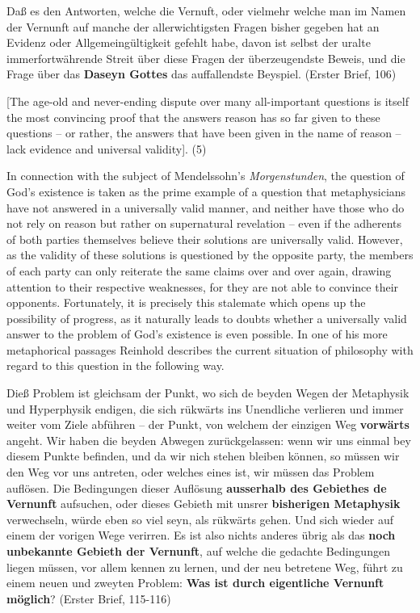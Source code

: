 Da\ss{} es den Antworten, welche die Vernuft, oder vielmehr welche man im Namen der Vernunft auf manche der allerwichtigsten Fragen bisher gegeben hat an Evidenz oder Allgemeing\"{u}ltigkeit gefehlt habe, davon ist selbst der uralte immerfortw\"{a}hrende Streit \"{u}ber diese Fragen der \"{u}berzeugendste Beweis, und die Frage \"{u}ber das \textbf{Daseyn Gottes} das auffallendste Beyspiel. (Erster Brief, 106)

[The age{-}old and never{-}ending dispute over many all{-}important questions is itself the most convincing proof that the answers reason has so far given to these questions {--} or rather, the answers that have been given in the name of reason {--} lack evidence and universal validity]. (5)

In connection with the subject of Mendelssohn's \textit{Morgenstunden}, the question of God's existence is taken as the prime example of a question that metaphysicians have not answered in a universally valid manner, and neither have those who do not rely on reason but rather on supernatural revelation {--} even if the adherents of both parties themselves believe their solutions are universally valid. However, as the validity of these solutions is questioned by the opposite party, the members of each party can only reiterate the same claims over and over again, drawing attention to their respective weaknesses, for they are not able to convince their opponents. Fortunately, it is precisely this stalemate which opens up the possibility of progress, as it naturally leads to doubts whether a universally valid answer to the problem of God's existence is even possible. In one of his more metaphorical passages Reinhold describes the current situation of philosophy with regard to this question in the following way. 

Die\ss{} Problem ist gleichsam der Punkt, wo sich de beyden Wegen der Metaphysik und Hyperphysik endigen, die sich r\"{u}kw\"{a}rts ins Unendliche verlieren und immer weiter vom Ziele abf\"{u}hren {--} der Punkt, von welchem der einzigen Weg \textbf{vorw\"{a}rts} angeht. Wir haben die beyden Abwegen zur\"{u}ckgelassen: wenn wir uns einmal bey diesem Punkte befinden, und da wir nich stehen bleiben k\"{o}nnen, so m\"{u}ssen wir den Weg vor uns antreten, oder welches eines ist, wir m\"{u}ssen das Problem aufl\"{o}sen. Die Bedingungen dieser Aufl\"{o}sung \textbf{ausserhalb des Gebiethes de Vernunft} aufsuchen, oder dieses Gebieth mit unsrer \textbf{bisherigen Metaphysik} verwechseln, w\"{u}rde eben so viel seyn, als r\"{u}kw\"{a}rts gehen. Und sich wieder auf einem der vorigen Wege verirren. Es ist also nichts anderes \"{u}brig als das \textbf{noch unbekannte Gebieth der Vernunft}, auf welche die gedachte Bedingungen liegen m\"{u}ssen, vor allem kennen zu lernen, und der neu betretene Weg, f\"{u}hrt zu einem neuen und zweyten Problem: \textbf{Was ist durch eigentliche Vernunft m\"{o}glich}? (Erster Brief, 115{-}116)

